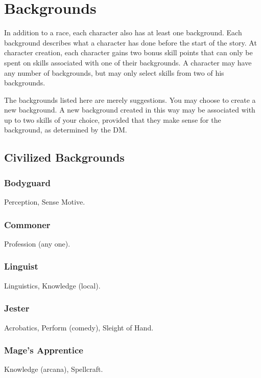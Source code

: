\section{Backgrounds}
In addition to a race, each character also has at least one background. Each background describes what a character has done before the start of the story. At character creation, each character gains two bonus skill points that can only be spent on skills associated with one of their backgrounds. A character may have any number of backgrounds, but may only select skills from two of his backgrounds.

The backgrounds listed here are merely suggestions. You may choose to create a new background. A new background created in this way may be associated with up to two skills of your choice, provided that they make sense for the background, as determined by the DM.


\subsection{Civilized Backgrounds}

\subsubsection{Bodyguard}
 Perception, Sense Motive.

\subsubsection{Commoner}
 Profession (any one).

\subsubsection{Linguist}
 Linguistics, Knowledge (local).

\subsubsection{Jester}
 Acrobatics, Perform (comedy), Sleight of Hand.

\subsubsection{Mage's Apprentice}
 Knowledge (arcana), Spellcraft.

